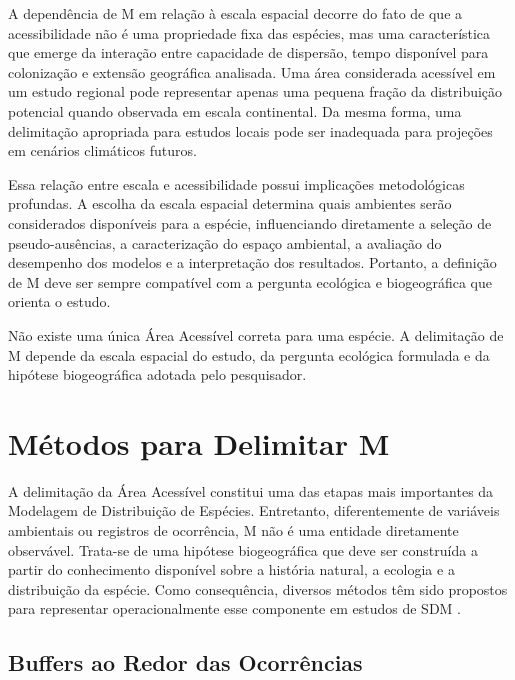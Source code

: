 A dependência de M em relação à escala espacial decorre do fato de que a acessibilidade não é uma propriedade fixa das espécies, mas uma característica que emerge da interação entre capacidade de dispersão, tempo disponível para colonização e extensão geográfica analisada. Uma área considerada acessível em um estudo regional pode representar apenas uma pequena fração da distribuição potencial quando observada em escala continental. Da mesma forma, uma delimitação apropriada para estudos locais pode ser inadequada para projeções em cenários climáticos futuros.

Essa relação entre escala e acessibilidade possui implicações metodológicas profundas. A escolha da escala espacial determina quais ambientes serão considerados disponíveis para a espécie, influenciando diretamente a seleção de pseudo-ausências, a caracterização do espaço ambiental, a avaliação do desempenho dos modelos e a interpretação dos resultados. Portanto, a definição de M deve ser sempre compatível com a pergunta ecológica e biogeográfica que orienta o estudo.

\begin{conceptbox}
	Não existe uma única Área Acessível correta para uma espécie. A delimitação de M depende da escala espacial do estudo, da pergunta ecológica formulada e da hipótese biogeográfica adotada pelo pesquisador.
\end{conceptbox}

\section{Métodos para Delimitar M}

A delimitação da Área Acessível constitui uma das etapas mais importantes da Modelagem de Distribuição de Espécies. Entretanto, diferentemente de variáveis ambientais ou registros de ocorrência, M não é uma entidade diretamente observável. Trata-se de uma hipótese biogeográfica que deve ser construída a partir do conhecimento disponível sobre a história natural, a ecologia e a distribuição da espécie. Como consequência, diversos métodos têm sido propostos para representar operacionalmente esse componente em estudos de SDM \parencite{Barve2011,Peterson2011}.

\subsection{Buffers ao Redor das Ocorrências}

